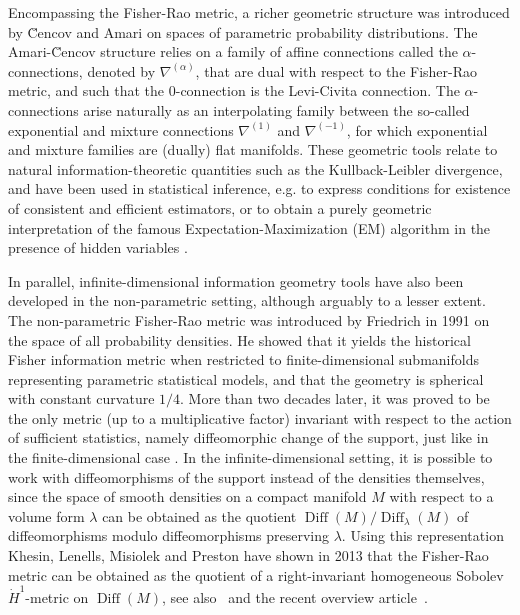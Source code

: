 \documentclass[11pt]{amsart}
\theoremstyle{definition}
\newcommand{\dx}{\lambda}
\newcommand{\Diff}{\operatorname{Diff}(M)}
\newcommand{\SDiff}{\operatorname{Diff}_{\dx}(M)}
\begin{document}
Encompassing the Fisher-Rao metric, a richer geometric structure was introduced by \u{C}encov \cite{cencov1982} and Amari \cite{amari2000methods} on spaces of parametric probability distributions. The Amari-\u{C}encov structure relies on a family of affine connections called the $\alpha$-connections, denoted by $\nabla^{(\alpha)}$, that are dual with respect to the Fisher-Rao metric, and such that the $0$-connection is the Levi-Civita connection. The $\alpha$-connections arise naturally as an interpolating family between the so-called exponential and mixture connections $\nabla^{(1)}$ and $\nabla^{(-1)}$, for which exponential and mixture families are (dually) flat manifolds. These geometric tools relate to natural information-theoretic quantities such as the Kullback-Leibler divergence, and have been used in statistical inference, e.g. to express conditions for existence of consistent and efficient estimators, or to obtain a purely geometric interpretation of the famous Expectation-Maximization (EM) algorithm in the presence of hidden variables \cite{amari2016information}.

In parallel, infinite-dimensional information geometry tools have also been developed in the non-parametric setting, although arguably to a lesser extent. 
The non-parametric Fisher-Rao metric was introduced by Friedrich in 1991 \cite{friedrich1991} on the space of all probability densities. 
He showed that it yields the historical Fisher information metric when restricted to finite-dimensional submanifolds representing parametric statistical models, and that the geometry is spherical with constant curvature $1/4$. More than two decades later, it was proved to be the only metric (up to a multiplicative factor) invariant with respect to the action of sufficient statistics, namely diffeomorphic change of the support, just like in the finite-dimensional case \cite{ay2015information, bauer2016uniqueness}. 
In the infinite-dimensional setting, it is possible to work with diffeomorphisms of the support instead of the densities themselves, since the space of smooth densities on a compact manifold $M$ with respect to a volume form $\dx$ can be obtained as the quotient $\Diff/\SDiff$ of diffeomorphisms modulo  diffeomorphisms preserving $\dx$. 
Using this representation Khesin, Lenells, Misiolek and Preston \cite{khesin2013geometry} have shown in 2013 that the Fisher-Rao metric can be obtained as the quotient of a right-invariant homogeneous Sobolev $\dot H^1$-metric on $\Diff$, see also~\cite{modin2015generalized} and the recent overview article~\cite{khesininformation}.
\end{document}
